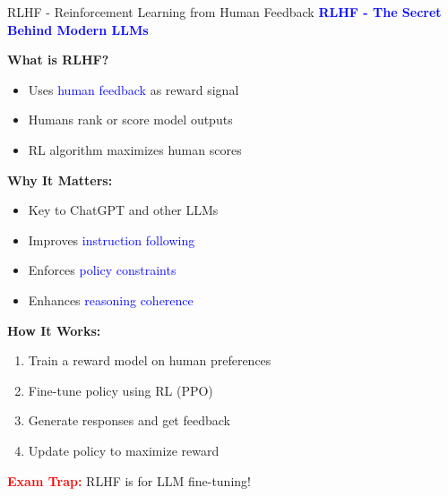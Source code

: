 \documentclass[8pt]{beamer}
\begin{document}
	\begin{frame}{RLHF - Reinforcement Learning from Human Feedback}
		\fontsize{6.5}{7.5}\selectfont
		\textcolor{blue}{\textbf{RLHF - The Secret Behind Modern LLMs}}
		
		\textbf{What is RLHF?}
		\begin{itemize}
			\item Uses \textcolor{blue}{human feedback} as reward signal
			\item Humans rank or score model outputs
			\item RL algorithm maximizes human scores
		\end{itemize}
		
		\textbf{Why It Matters:}
		\begin{itemize}
			\item Key to ChatGPT and other LLMs
			\item Improves \textcolor{blue}{instruction following}
			\item Enforces \textcolor{blue}{policy constraints}
			\item Enhances \textcolor{blue}{reasoning coherence}
		\end{itemize}
		
		\textbf{How It Works:}
		\begin{enumerate}
			\item Train a reward model on human preferences
			\item Fine-tune policy using RL (PPO)
			\item Generate responses and get feedback
			\item Update policy to maximize reward
		\end{enumerate}
		
		\textcolor{red}{\textbf{Exam Trap:}} RLHF is for LLM fine-tuning!
	\end{frame}
	
\end{document}
